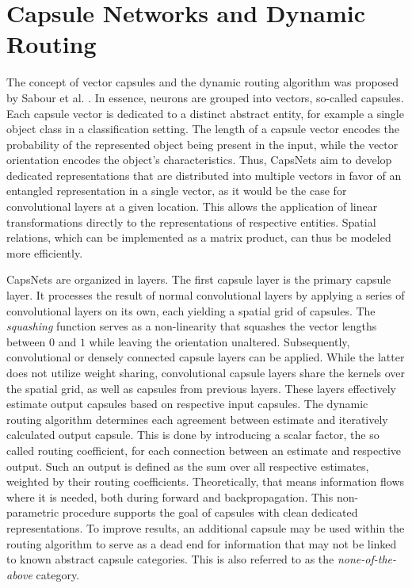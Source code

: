 \documentclass{article}
\begin{document}
\section{Capsule Networks and Dynamic Routing}
\label{lab:capsules}
The concept of vector capsules and the dynamic routing algorithm was proposed by Sabour et al. .
In essence, neurons are grouped into vectors, so-called capsules. Each capsule vector is dedicated to a distinct abstract entity, for example a single object class in a classification setting. The length of a capsule vector encodes the probability of the represented object being present in the input, while the vector orientation encodes the object's characteristics. Thus, CapsNets aim to develop dedicated representations that are distributed into multiple vectors in favor of an entangled representation in a single vector, as it would be the case for convolutional layers at a given location.
This allows the application of linear transformations directly to the representations of respective entities. Spatial relations, which can be implemented as a matrix product, can thus be modeled more efficiently.

CapsNets are organized in layers. The first capsule layer is the primary capsule layer. It processes the result of normal convolutional layers by applying a series of convolutional layers on its own, each yielding a spatial grid of capsules. The \textit{squashing} function serves as a non-linearity that squashes the vector lengths between $0$ and $1$ while leaving the orientation unaltered.
Subsequently, convolutional or densely connected capsule layers can be applied. While the latter does not utilize weight sharing, convolutional capsule layers share the kernels over the spatial grid, as well as capsules from previous layers. 
These layers effectively estimate output capsules based on respective input capsules. The dynamic routing algorithm determines each agreement between estimate and iteratively calculated output capsule. This is done by introducing a scalar factor, the so called routing coefficient, for each connection between an estimate and respective output. Such an output is defined as the sum over all respective estimates, weighted by their routing coefficients. Theoretically, that means information flows where it is needed, both during forward and backpropagation. This non-parametric procedure supports the goal of capsules with clean dedicated representations. To improve results, an additional capsule may be used within the routing algorithm to serve as a dead end for information that may not be linked to known abstract capsule categories. This is also referred to as the \emph{none-of-the-above} category.
\end{document}
